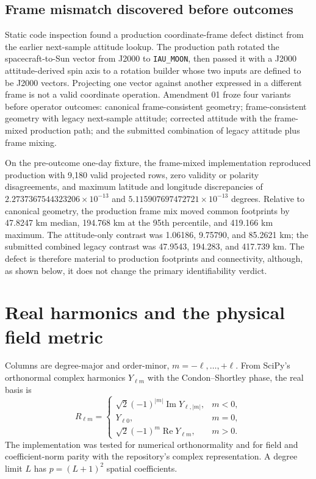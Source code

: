 \documentclass[11pt]{article}
\begin{document}
\subsection{Frame mismatch discovered before outcomes}

Static code inspection found a production coordinate-frame defect distinct
from the earlier next-sample attitude lookup.  The production path rotated the
spacecraft-to-Sun vector from J2000 to \texttt{IAU\_MOON}, then passed it with a
J2000 attitude-derived spin axis to a rotation builder whose two inputs are
defined to be J2000 vectors.  Projecting one vector against another expressed
in a different frame is not a valid coordinate operation.  Amendment 01 froze
four variants before operator outcomes: canonical frame-consistent geometry;
frame-consistent geometry with legacy next-sample attitude; corrected attitude
with the frame-mixed production path; and the submitted combination of legacy
attitude plus frame mixing.

On the pre-outcome one-day fixture, the frame-mixed implementation reproduced
production with 9,180 valid projected rows, zero validity or polarity
disagreements, and maximum latitude and longitude discrepancies of
$2.2737367544323206\times10^{-13}$ and
$5.115907697472721\times10^{-13}$ degrees.  Relative to canonical geometry,
the production frame mix moved common footprints by 47.8247 km median,
194.768 km at the 95th percentile, and 419.166 km maximum.  The attitude-only
contrast was 1.06186, 9.75790, and 85.2621 km; the submitted combined legacy
contrast was 47.9543, 194.283, and 417.739 km.  The defect is therefore material
to production footprints and connectivity, although, as shown below, it does
not change the primary identifiability verdict.

\section{Real harmonics and the physical field metric}

Columns are degree-major and order-minor, $m=-\ell,\ldots,+\ell$.  From
SciPy's orthonormal complex harmonics $Y_{\ell m}$ with the Condon--Shortley
phase, the real basis is
\begin{equation}
R_{\ell m}=\begin{cases}
 \sqrt{2}(-1)^{|m|}\operatorname{Im}Y_{\ell,|m|}, &m<0,\\
 Y_{\ell0}, &m=0,\\
 \sqrt{2}(-1)^m\operatorname{Re}Y_{\ell m}, &m>0.
\end{cases}
\label{eq:realbasis}
\end{equation}
The implementation was tested for numerical orthonormality and for field and
coefficient-norm parity with the repository's complex representation.  A
degree limit $L$ has $p=(L+1)^2$ spatial coefficients.
\end{document}

